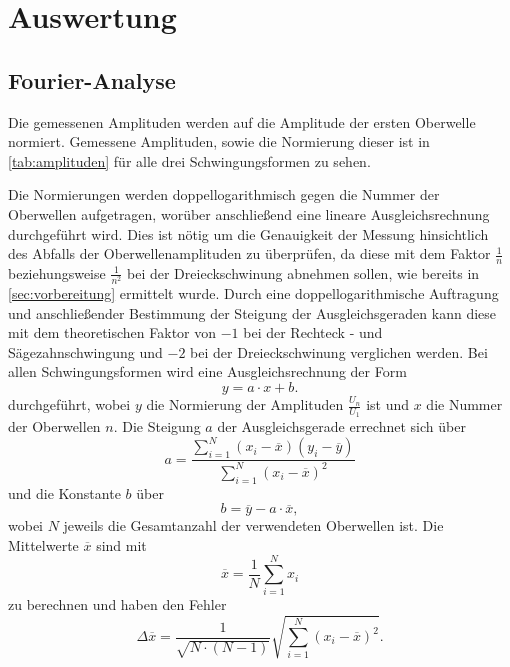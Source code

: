 \section{Auswertung}
\label{sec:Auswertung}

\subsection{Fourier-Analyse}
Die gemessenen Amplituden werden auf die Amplitude der ersten Oberwelle normiert. Gemessene Amplituden, sowie die Normierung 
dieser ist in \autoref{tab:amplituden} für alle drei Schwingungsformen zu sehen.

Die Normierungen werden doppellogarithmisch gegen die Nummer der Oberwellen aufgetragen, worüber anschließend eine lineare
Ausgleichsrechnung durchgeführt wird. Dies ist nötig um die Genauigkeit der Messung hinsichtlich des Abfalls der Oberwellenamplituden
zu überprüfen, da diese mit dem Faktor $\frac{1}{n}$ beziehungsweise $\frac{1}{n^2}$ bei der Dreieckschwinung abnehmen sollen, wie 
bereits in \autoref{sec:vorbereitung} ermittelt wurde.
Durch eine doppellogarithmische Auftragung und anschließender Bestimmung der Steigung der Ausgleichsgeraden kann diese mit dem 
theoretischen Faktor von $-1$ bei der Rechteck - und Sägezahnschwingung und $-2$ bei der Dreieckschwinung verglichen werden. 
Bei allen Schwingungsformen wird eine Ausgleichsrechnung der Form 
\begin{equation}
y = a \cdot x + b.
\end{equation} 
durchgeführt, wobei $y$ die Normierung der Amplituden  $\frac{U_n}{U_1}$ ist und  $x$ die Nummer der Oberwellen $n$.
Die Steigung $a$ der Ausgleichsgerade errechnet sich über 
\begin{equation}
\label{eqn:a}
a = \frac {\sum_{i=1}^N (x_i - \overline{x}) (y_i - \overline{y})}{\sum_{i=1}^N (x_i - \overline{x})^2}
\end{equation}
und die Konstante $b$ über
\begin{equation}
\label{eqt:b}
b = \overline{y} - a \cdot \overline{x},
\end{equation}
wobei $N$ jeweils die Gesamtanzahl der verwendeten Oberwellen ist.
Die Mittelwerte $\overline{x}$ sind mit 
\begin{equation}
\label{eqt:mittelwert}
\overline{x} = \frac {1} {N} \sum_{i=1}^N x_i
\end{equation}
zu berechnen und haben den Fehler
\begin{equation}
\label{eqt:FehlerMittelwert}
\Delta \overline{x} = \frac{1}{\sqrt{N \cdot (N-1)}} \sqrt{ \sum_{i=1}^N (x_i - \overline{x})^2}.
\end{equation}

